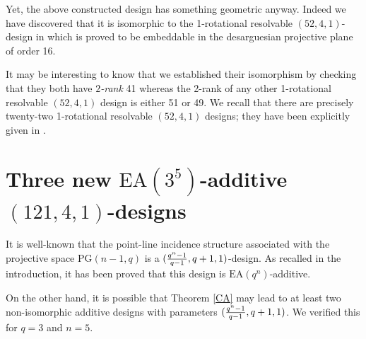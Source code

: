 \documentclass[a4paper, 11pt]{article}
\theoremstyle{definition}
\theoremstyle{definition}
\theoremstyle{definition}
\numberwithin{equation}{section}
\begin{document}
Yet, the above constructed design has something geometric anyway. 
Indeed we have discovered that it is isomorphic to the 1-rotational resolvable $(52,4,1)$-design in \cite{HTK} which is proved to be embeddable
in the desarguesian projective plane of order 16.

It may be interesting to know that we established their isomorphism
by checking that they both have {\it $2$-rank} 41 whereas the 2-rank of any other 1-rotational resolvable $(52,4,1)$ design is either 51 or 49.
We recall that there are precisely twenty-two 1-rotational resolvable $(52,4,1)$ designs; they have been
explicitly given in \cite{BZ2}.

\section{Three new $\mathrm{EA}(3^5)$-additive $(121,4,1)$-designs}

It is well-known that the point-line incidence structure associated with the projective space $\mathrm{PG}(n-1,q)$
is a $({q^n-1\over q-1},q+1,1)$-design. As recalled in the introduction, it has been proved that this design 
is $\mathrm{EA}(q^n)$-additive. 

On the other hand, it is possible that Theorem \ref{CA} may lead to at least two non-isomorphic
additive designs with parameters $({q^n-1\over q-1},q+1,1)$. We verified this for $q=3$ and $n=5$.
\end{document}
